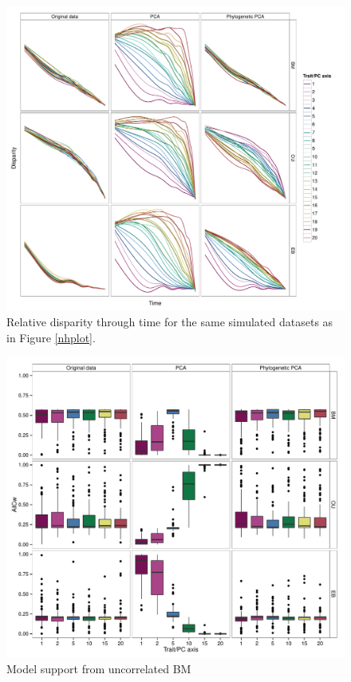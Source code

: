 \documentclass[a4paper,12pt]{article}
\begin{document}
\begin{figure}[p]
\centering
\includegraphics[scale=0.65]{./fig/dtt-3models.pdf}
\caption{Relative disparity through time for the same simulated datasets as in Figure \ref{nhplot}.}
\label{dttplot}
\end{figure}

\renewcommand\thefigure{S\arabic{figure}}
\renewcommand\thetable{S \arabic{table}}
\setcounter{figure}{0}    
\setcounter{table}{0}

\begin{figure}[p]
\centering
\includegraphics[scale=0.65]{./fig/box-aicw-mvbm.pdf}
\caption{Model support from uncorrelated BM}
\label{aicwbm}
\end{figure}
\end{document}
